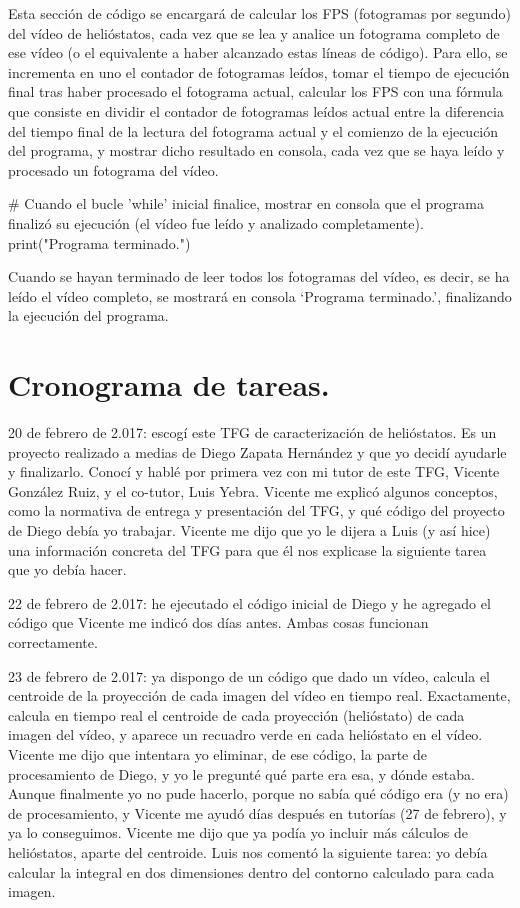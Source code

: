 \documentclass[12pt]{article}
\begin{document}
Esta sección de código se encargará de calcular los FPS (fotogramas por segundo) del vídeo de helióstatos, cada vez que se lea y analice un fotograma completo de ese vídeo (o el equivalente a haber alcanzado estas líneas de código). Para ello, se incrementa en uno el contador de fotogramas leídos, tomar el tiempo de ejecución final tras haber procesado el fotograma actual, calcular los FPS con una fórmula que consiste en dividir el contador de fotogramas leídos actual entre la diferencia del tiempo final de la lectura del fotograma actual y el comienzo de la ejecución del programa, y mostrar dicho resultado en consola, cada vez que se haya leído y procesado un fotograma del vídeo.


\# Cuando el bucle 'while' inicial finalice, mostrar en consola que el programa finalizó su ejecución (el vídeo fue leído y analizado completamente).
print("Programa terminado.")

Cuando se hayan terminado de leer todos los fotogramas del vídeo, es decir, se ha leído el vídeo completo, se mostrará en consola ‘Programa terminado.’, finalizando la ejecución del programa.


\section{Cronograma de tareas.}

20 de febrero de 2.017: escogí este TFG de caracterización de helióstatos. Es un proyecto realizado a medias de Diego Zapata Hernández y que yo decidí ayudarle y finalizarlo. Conocí y hablé por primera vez con mi tutor de este TFG, Vicente González Ruiz, y el co-tutor, Luis Yebra. Vicente me explicó algunos conceptos, como la normativa de entrega y presentación del TFG, y qué código del proyecto de Diego debía yo trabajar. Vicente me dijo que yo le dijera a Luis (y así hice) una información concreta del TFG para que él nos explicase la siguiente tarea que yo debía hacer.

22 de febrero de 2.017: he ejecutado el código inicial de Diego y he agregado el código que Vicente me indicó dos días antes. Ambas cosas funcionan correctamente.

23 de febrero de 2.017: ya dispongo de un código que dado un vídeo, calcula el centroide de la proyección de cada imagen del vídeo en tiempo real. Exactamente, calcula en tiempo real el centroide de cada proyección (helióstato) de cada imagen del vídeo, y aparece un recuadro verde en cada helióstato en el vídeo. Vicente me dijo que intentara yo eliminar, de ese código, la parte de procesamiento de Diego, y yo le pregunté qué parte era esa, y dónde estaba. Aunque finalmente yo no pude hacerlo, porque no sabía qué código era (y no era) de procesamiento, y Vicente me ayudó días después en tutorías (27 de febrero), y ya lo conseguimos. Vicente me dijo que ya podía yo incluir más cálculos de helióstatos, aparte del centroide. Luis nos comentó la siguiente tarea: yo debía calcular la integral en dos dimensiones dentro del contorno calculado para cada imagen.
\end{document}
